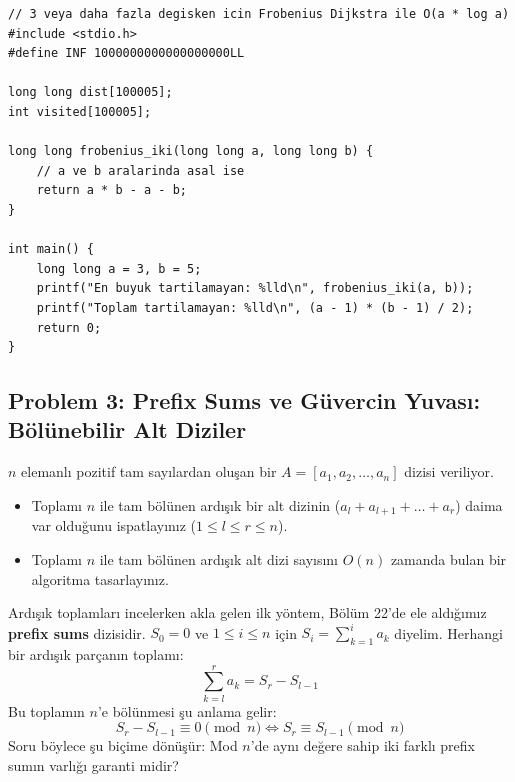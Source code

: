 \begin{lstlisting}[language=CTemel]
// 3 veya daha fazla degisken icin Frobenius Dijkstra ile O(a * log a)
#include <stdio.h>
#define INF 1000000000000000000LL

long long dist[100005];
int visited[100005];

long long frobenius_iki(long long a, long long b) {
    // a ve b aralarinda asal ise
    return a * b - a - b;
}

int main() {
    long long a = 3, b = 5;
    printf("En buyuk tartilamayan: %lld\n", frobenius_iki(a, b));
    printf("Toplam tartilamayan: %lld\n", (a - 1) * (b - 1) / 2);
    return 0;
}
\end{lstlisting}

\subsection{Problem 3: Prefix Sums ve Güvercin Yuvası: Bölünebilir Alt Diziler}

\begin{example}
$n$ elemanlı pozitif tam sayılardan oluşan bir $A = [a_1, a_2, \dots, a_n]$ dizisi veriliyor.
\begin{itemize}
    \item[(a)] Toplamı $n$ ile tam bölünen ardışık bir alt dizinin ($a_l + a_{l+1} + \dots + a_r$) daima var olduğunu ispatlayınız ($1 \le l \le r \le n$).
    \item[(b)] Toplamı $n$ ile tam bölünen ardışık alt dizi sayısını $O(n)$ zamanda bulan bir algoritma tasarlayınız.
\end{itemize}
\end{example}

Ardışık toplamları incelerken akla gelen ilk yöntem, Bölüm 22'de ele aldığımız \textbf{prefix sums} dizisidir.
$S_0 = 0$ ve $1 \le i \le n$ için $S_i = \sum_{k=1}^i a_k$ diyelim.
Herhangi bir ardışık parçanın toplamı:
\[
\sum_{k=l}^r a_k = S_r - S_{l-1}
\]
Bu toplamın $n$'e bölünmesi şu anlama gelir:
\[
S_r - S_{l-1} \equiv 0 \pmod n \iff S_r \equiv S_{l-1} \pmod n
\]
Soru böylece şu biçime dönüşür: Mod $n$'de aynı değere sahip iki farklı prefix sumın varlığı garanti midir?

